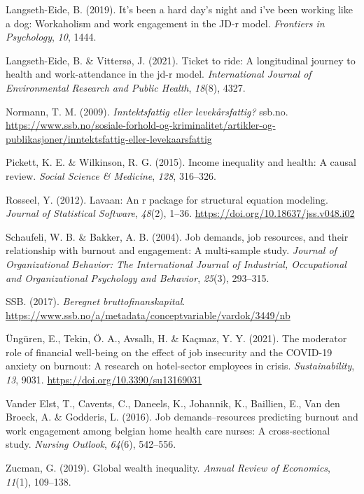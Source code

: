 \documentclass[
  12pt,
  a4paper,
  DIV=11,
  numbers=noendperiod]{scrartcl}
\newlength{\cslhangindent}
\newenvironment{CSLReferences}[2] %
 {\begin{list}{}{%
  \setlength{\itemindent}{0pt}
  \setlength{\leftmargin}{0pt}
  \setlength{\parsep}{0pt}
  \ifodd #1
   \setlength{\leftmargin}{\cslhangindent}
   \setlength{\itemindent}{-1\cslhangindent}
  \fi
  \setlength{\itemsep}{#2\baselineskip}}}
 {\end{list}}
\begin{document}
\begin{CSLReferences}{1}{0}
Langseth-Eide, B. (2019). It's been a hard day's night and i've been
working like a dog: Workaholism and work engagement in the JD-r model.
\emph{Frontiers in Psychology}, \emph{10}, 1444.

Langseth-Eide, B. \& Vittersø, J. (2021). Ticket to ride: A longitudinal
journey to health and work-attendance in the jd-r model.
\emph{International Journal of Environmental Research and Public
Health}, \emph{18}(8), 4327.

Normann, T. M. (2009). \emph{Inntektsfattig eller levekårsfattig?}
ssb.no.
\url{https://www.ssb.no/sosiale-forhold-og-kriminalitet/artikler-og-publikasjoner/inntektsfattig-eller-levekaarsfattig}

Pickett, K. E. \& Wilkinson, R. G. (2015). Income inequality and health:
A causal review. \emph{Social Science \& Medicine}, \emph{128},
316--326.

Rosseel, Y. (2012). Lavaan: An r package for structural equation
modeling. \emph{Journal of Statistical Software}, \emph{48}(2), 1--36.
\url{https://doi.org/10.18637/jss.v048.i02}

Schaufeli, W. B. \& Bakker, A. B. (2004). Job demands, job resources,
and their relationship with burnout and engagement: A multi-sample
study. \emph{Journal of Organizational Behavior: The International
Journal of Industrial, Occupational and Organizational Psychology and
Behavior}, \emph{25}(3), 293--315.

SSB. (2017). \emph{Beregnet bruttofinanskapital}.
\url{https://www.ssb.no/a/metadata/conceptvariable/vardok/3449/nb}

Üngüren, E., Tekin, Ö. A., Avsallı, H. \& Kaçmaz, Y. Y. (2021). The
moderator role of financial well-being on the effect of job insecurity
and the COVID-19 anxiety on burnout: A research on hotel-sector
employees in crisis. \emph{Sustainability}, \emph{13}, 9031.
\url{https://doi.org/10.3390/su13169031}

Vander Elst, T., Cavents, C., Daneels, K., Johannik, K., Baillien, E.,
Van den Broeck, A. \& Godderis, L. (2016). Job demands--resources
predicting burnout and work engagement among belgian home health care
nurses: A cross-sectional study. \emph{Nursing Outlook}, \emph{64}(6),
542--556.

Zucman, G. (2019). Global wealth inequality. \emph{Annual Review of
Economics}, \emph{11}(1), 109--138.

\end{CSLReferences}
\end{document}
